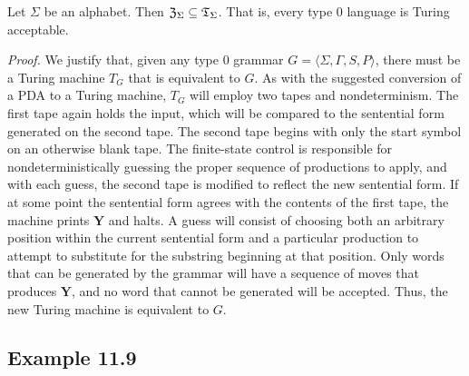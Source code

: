 \begin{thm}\label{thm-11.2}
Let $\Sigma$ be an alphabet. Then $\mathfrak{Z}_\Sigma\subseteq\mathfrak{T}_\Sigma$. That is, every type 0
language is Turing acceptable.

\emph{Proof.} We justify that, given any type 0 grammar $G=\langle\Sigma,\Gamma,
S,P\rangle$, there must be a Turing machine $T_G$ that is equivalent to $G$. As
with the suggested conversion of a PDA to a Turing machine, $T_G$ will employ
two tapes and nondeterminism. The first tape again holds the input, which will
be compared to the sentential form generated on the second tape. The second tape
begins with only the start symbol on an otherwise blank tape. The finite-state
control is responsible for nondeterministically guessing the proper sequence of
productions to apply, and with each guess, the second tape is modified to
reflect the new sentential form. If at some point the sentential form agrees
with the contents of the first tape, the machine prints $\pmb{Y}$ and halts. A
guess will consist of choosing both an arbitrary position within the current
sentential form and a particular production to attempt to substitute for the
substring beginning at that position. Only words that can be generated by the
grammar will have a sequence of moves that produces $\pmb{Y}$, and no word that
cannot be generated will be accepted. Thus, the new Turing machine is equivalent
to $G$.
\end{thm}

\subsection*{Example 11.9}

